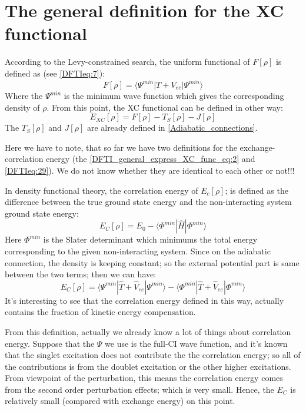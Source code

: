 \section{The general definition for the XC functional}
\label{DFTI:5}
%
%
%
According to the Levy-constrained search, the uniform functional of $F[\rho]$
is defined as (see \ref{DFTIeq:7}):
\begin{equation}
 \label{DFTI_general_express_XC_func_eq:1}
F[\rho] = \langle\Psi^{min}|T+V_{ee}|\Psi^{min}\rangle
\end{equation}
Where the $\Psi^{min}$ is the minimum wave function which gives the
corresponding density of $\rho$. From this point, the XC functional can be
defined in other way:
\begin{equation}
 \label{DFTI_general_express_XC_func_eq:2}
E_{XC}[\rho] = F[\rho] - T_{S}[\rho] - J[\rho]
\end{equation}
The $T_{S}[\rho]$ and $J[\rho]$ are already defined in
\ref{Adiabatic_connections}.

Here we have to note, that so far we have two definitions for the
exchange-correlation energy (the \ref{DFTI_general_express_XC_func_eq:2} and
\ref{DFTIeq:29}). We do not know whether they are identical to each other or
not!!!  

In density functional theory, the correlation energy of $E_{c}[\rho]$; is
defined as the difference between the true ground state energy and the
non-interacting system ground state energy:
\begin{equation}
 \label{DFTI_general_express_XC_func_eq:3}
E_{C}[\rho] = E_{0} - \langle\Phi^{min}|\hat{H}|\Phi^{min}\rangle
\end{equation}
Here $\Phi^{min}$ is the Slater determinant which minimums the total energy
corresponding to the given non-interacting system. Since on the adiabatic
connection, the density is keeping constant; so the external potential part is
same between the two terms; then we can have:
\begin{equation}
 \label{DFTI_general_express_XC_func_eq:4}
E_{C}[\rho] = \langle\Psi^{min}|\hat{T} + \hat{V}_{ee}|\Psi^{min}\rangle -
\langle\Phi^{min}|\hat{T} + \hat{V}_{ee}|\Phi^{min}\rangle
\end{equation} 
It's interesting to see that the correlation energy defined in this
way, actually contains the fraction of kinetic energy compensation.

From this definition, actually we already know a lot of things about
correlation energy. Suppose that the $\Psi$ we use is the full-CI wave
function, and it's known that the singlet excitation does not contribute the
the correlation energy; so all of the contributions is from the doublet
excitation or the other higher excitations. From viewpoint of the
perturbation, this means the correlation energy comes from the second order
perturbation effects; which is very small. Hence, the $E_{C}$ is relatively
small (compared with exchange energy) on this point.

